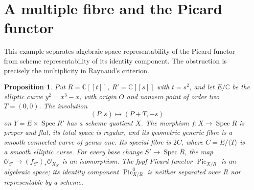 \documentclass[11pt,a4paper]{article}
\newtheorem{proposition}[theorem]{Proposition}
\theoremstyle{definition}
\newcommand{\Spec}{\operatorname{Spec}}
\newcommand{\C}{\mathbb C}
\begin{document}
\section{A multiple fibre and the Picard functor}
This example separates algebraic-space representability of the Picard functor from scheme representability of its identity component. The obstruction is precisely the multiplicity in Raynaud's criterion.

\begin{proposition}\label{prop:double-fibre-picard}
Put $R=\C[[t]]$, $R'=\C[[s]]$ with $t=s^2$, and let $E/\C$ be the elliptic curve $y^2=x^3-x$, with origin $O$ and nonzero point of order two $T=(0,0)$. The involution
\[
 (P,s)\longmapsto(P+T,-s)
\]
on $Y=E\times\Spec R'$ has a scheme quotient $X$. The morphism $f:X\to\Spec R$ is proper and flat, its total space is regular, and its geometric generic fibre is a smooth connected curve of genus one. Its special fibre is $2C$, where $C=E/\langle T\rangle$ is a smooth elliptic curve. For every base change $S'\to\Spec R$, the map $\mathcal O_{S'}\to(f_{S'})_*\mathcal O_{X_{S'}}$ is an isomorphism. The fppf Picard functor $\operatorname{Pic}_{X/R}$ is an algebraic space; its identity component $\operatorname{Pic}^0_{X/R}$ is neither separated over $R$ nor representable by a scheme.
\end{proposition}
\end{document}
